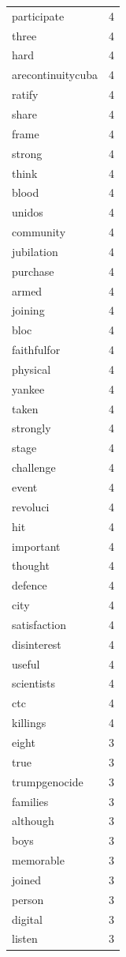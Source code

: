 \begin{tabular}{lr}
participate & 4 \\
three & 4 \\
hard & 4 \\
arecontinuitycuba & 4 \\
ratify & 4 \\
share & 4 \\
frame & 4 \\
strong & 4 \\
think & 4 \\
blood & 4 \\
unidos & 4 \\
community & 4 \\
jubilation & 4 \\
purchase & 4 \\
armed & 4 \\
joining & 4 \\
bloc & 4 \\
faithfulfor & 4 \\
physical & 4 \\
yankee & 4 \\
taken & 4 \\
strongly & 4 \\
stage & 4 \\
challenge & 4 \\
event & 4 \\
revoluci & 4 \\
hit & 4 \\
important & 4 \\
thought & 4 \\
defence & 4 \\
city & 4 \\
satisfaction & 4 \\
disinterest & 4 \\
useful & 4 \\
scientists & 4 \\
ctc & 4 \\
killings & 4 \\
eight & 3 \\
true & 3 \\
trumpgenocide & 3 \\
families & 3 \\
although & 3 \\
boys & 3 \\
memorable & 3 \\
joined & 3 \\
person & 3 \\
digital & 3 \\
listen & 3 \\

\end{tabular}
